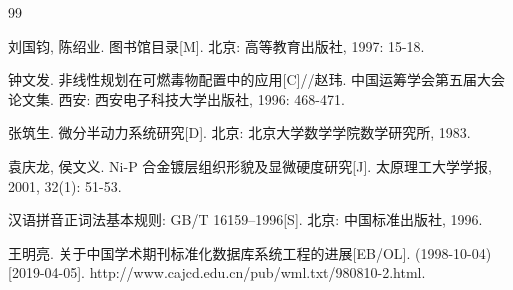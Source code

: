 \cleardoublepage
{}
\begin{thebibliography}{99}

 刘国钧, 陈绍业. 图书馆目录[M]. 北京: 高等教育出版社, 1997: 15-18.

 钟文发. 非线性规划在可燃毒物配置中的应用[C]//赵玮. 中国运筹学会第五届大会论文集. 西安: 西安电子科技大学出版社, 1996: 468-471.

 张筑生. 微分半动力系统研究[D]. 北京: 北京大学数学学院数学研究所, 1983.

 袁庆龙, 侯文义. Ni-P 合金镀层组织形貌及显微硬度研究[J]. 太原理工大学学报, 2001, 32(1): 51-53.

 汉语拼音正词法基本规则: GB/T 16159--1996[S]. 北京: 中国标准出版社, 1996.

 王明亮. 关于中国学术期刊标准化数据库系统工程的进展[EB/OL]. (1998-10-04)[2019-04-05]. http://www.cajcd.edu.cn/pub/wml.txt/980810-2.html.

\end{thebibliography}
